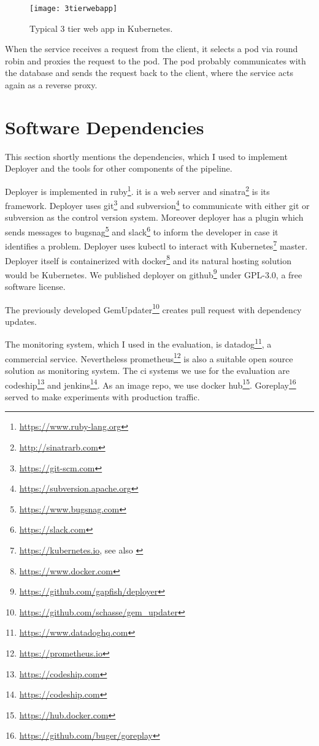 \begin{figure}[htbp]
  \centering
  \texttt{[image: 3tierwebapp]}
  \caption[3tierwebapp]{Typical 3 tier web app in Kubernetes.}
  \label{fig:3tierwebapp}
\end{figure}

When the service receives a request from the client, it selects a pod via round robin and
proxies the request to the pod. The pod probably communicates with the database and sends
the request back to the client, where the service acts again as a reverse proxy.

\section{Software Dependencies}

This section shortly mentions the dependencies, which I used to implement Deployer and the
tools for other components of the pipeline.

Deployer is implemented in ruby\footnote{\url{https://www.ruby-lang.org}}. it is a
web server and sinatra\footnote{\url{http://sinatrarb.com}} is its framework. Deployer uses
git\footnote{\url{https://git-scm.com}} and
subversion\footnote{\url{https://subversion.apache.org}} to communicate with either git or
subversion as the control version system. Moreover deployer has a plugin which sends
messages to bugsnag\footnote{\url{https://www.bugsnag.com}} and
slack\footnote{\url{https://slack.com}} to inform the developer in case it identifies a
problem. Deployer uses kubectl to interact with
Kubernetes\footnote{\url{https://kubernetes.io}, see also
  \cite{kubernetes_architecture,kubernetes_architecture2}} master. Deployer itself is
containerized with docker\footnote{\url{https://www.docker.com}} and its natural hosting
solution would be Kubernetes. We published deployer on
github\footnote{\url{https://github.com/gapfish/deployer}} under GPL-3.0, a free software
license.

The previously developed GemUpdater\footnote{\url{https://github.com/schasse/gem_updater}}
creates pull request with dependency updates.

The monitoring system, which I used in the evaluation, is
datadog\footnote{\url{https://www.datadoghq.com}}, a commercial service. Nevertheless
prometheus\footnote{\url{https://prometheus.io}} is also a suitable open source solution
as monitoring system. The \gls{ci} systems we use for the evaluation are
codeship\footnote{\url{https://codeship.com}} and
jenkins\footnote{\url{https://codeship.com}}. As an image repo, we use docker
hub\footnote{\url{https://hub.docker.com}}. Goreplay\footnote{\url{https://github.com/buger/goreplay}}
served to make experiments with production traffic.

